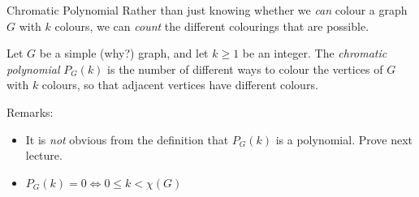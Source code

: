\documentclass{beamer}
\begin{document}
\begin{frame}{Chromatic Polynomial}
  Rather than just knowing whether we \emph{can} colour a graph $G$ with $k$ colours, we can \emph{count} the different colourings that are possible.

  \begin{definition}Let $G$ be a simple (why?) graph, and let $k\geq 1$ be an integer.  The \emph{chromatic polynomial} $P_G(k)$ is the number of different ways to colour the vertices of $G$ with $k$ colours, so that adjacent vertices have different colours.
  \end{definition}

  \begin{block}{Remarks:}
    \begin{itemize}
    \item It is \emph{not} obvious from the definition that $P_G(k)$ is a polynomial. Prove next lecture.
    \item $P_G(k)=0\iff 0\leq k <\chi(G)$
    \end{itemize}
    \end{block}
\end{frame}  
\end{document}
